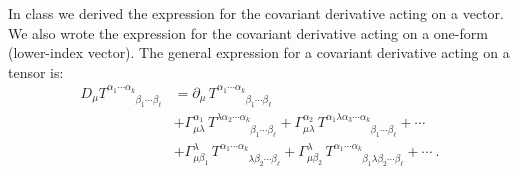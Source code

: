 \documentclass[12pt]{article}
\numberwithin{equation}{section}    %
\begin{document}
In class we derived the expression for the covariant derivative acting on a vector. We also wrote the expression for the covariant derivative acting on a one-form (lower-index vector). The general expression for a covariant derivative acting on a tensor is:
\begin{align}
	D_\mu T^{\alpha_1\cdots \alpha_k}_{\phantom{\alpha_1\cdots \alpha_k}\beta_1\cdots \beta_\ell}
	&= 
	\partial_\mu \, T^{\alpha_1\cdots \alpha_k}_{\phantom{\alpha_1\cdots \alpha_k}\beta_1\cdots \beta_\ell}
	\\
	& + \Gamma^{\alpha_1}_{\mu \lambda}\,
	T^{\lambda\alpha_2\cdots \alpha_k}_{\phantom{\lambda\alpha_2\cdots \alpha_k}\beta_1\cdots \beta_\ell}
	+
	\Gamma^{\alpha_2}_{\mu \lambda}\,
	T^{\alpha_1\lambda\alpha_3\cdots \alpha_k}_{\phantom{\alpha_1\lambda\alpha_3\cdots \alpha_k}\beta_1\cdots \beta_\ell}
	+\cdots
	\\
	&
	+ \Gamma^{\lambda}_{\mu\beta_1}\,
	T^{\alpha_1\cdots \alpha_k}_{\phantom{\alpha_1\cdots \alpha_k}\lambda\beta_2\cdots \beta_\ell}
	+ \Gamma^{\lambda}_{\mu\beta_2}\,
	T^{\alpha_1\cdots \alpha_k}_{\phantom{\alpha_1\cdots \alpha_k}\beta_1\lambda\beta_2\cdots \beta_\ell}
	+\cdots \ .
\end{align}
\end{document}
